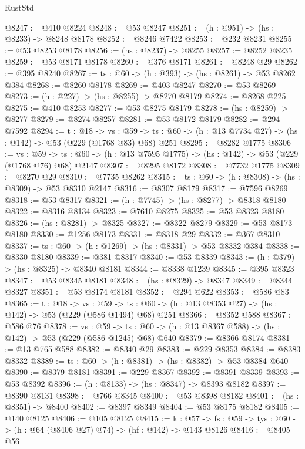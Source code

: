 \begin{lexlean}{RustStd}
\begin{coremodule}
@8247 := @410 @8224
@8248 := @53 @8247
@8251 := (h : @951) -> (hs : @8233) -> @8248 @8178
@8252 := @8246 @7422
@8253 := @232 @8231
@8255 := @53 @8253 @8178
@8256 := (hs : @8237) -> @8255
@8257 := @8252 @8235
@8259 := @53 @8171 @8178
@8260 := @376 @8171
@8261 := @8248 @29
@8262 := @395 @8240
@8267 := {ts : @60} -> (h : @393) -> (hs : @8261) -> @53 @8262 @384
@8268 := @8260 @8178
@8269 := @403 @8247
@8270 := @53 @8269
@8273 := (h : @227) -> (hs : @8255) -> @8270 @8179
@8274 := @8268 @225
@8275 := @410 @8253
@8277 := @53 @8275 @8179
@8278 := (hs : @8259) -> @8277
@8279 := @8274 @8257
@8281 := @53 @8172 @8179
@8282 := @294 @7592
@8294 := {t : @18} ->
  {vs : @59} -> {ts : @60} -> (h : @13 @7734 @27) -> (hs : @142) -> @53 (@229 (@1768 @83) @68) @251
@8295 := @8282 @1775
@8306 := {vs : @59} ->
  {ts : @60} -> (h : @13 @7595 @1775) -> (hs : @142) -> @53 (@229 (@1768 @76) @68) @2147
@8307 := @8295 @8172
@8308 := @7732 @1775
@8309 := @8270 @29
@8310 := @7735 @8262
@8315 := {ts : @60} -> (h : @8308) -> (hs : @8309) -> @53 @8310 @2147
@8316 := @8307 @8179
@8317 := @7596 @8269
@8318 := @53 @8317
@8321 := (h : @7745) -> (hs : @8277) -> @8318 @8180
@8322 := @8316 @8134
@8323 := @7610 @8275
@8325 := @53 @8323 @8180
@8326 := (hs : @8281) -> @8325
@8327 := @8322 @8279
@8329 := @53 @8173 @8180
@8330 := @1256 @8173
@8331 := @8318 @29
@8332 := @367 @8310
@8337 := {ts : @60} -> (h : @1269) -> (hs : @8331) -> @53 @8332 @384
@8338 := @8330 @8180
@8339 := @381 @8317
@8340 := @53 @8339
@8343 := (h : @379) -> (hs : @8325) -> @8340 @8181
@8344 := @8338 @1239
@8345 := @395 @8323
@8347 := @53 @8345 @8181
@8348 := (hs : @8329) -> @8347
@8349 := @8344 @8327
@8351 := @53 @8174 @8181
@8352 := @294 @622
@8353 := @586 @83
@8365 := {t : @18} ->
  {vs : @59} -> {ts : @60} -> (h : @13 @8353 @27) -> (hs : @142) -> @53 (@229 (@586 @1494) @68) @251
@8366 := @8352 @588
@8367 := @586 @76
@8378 := {vs : @59} ->
  {ts : @60} -> (h : @13 @8367 @588) -> (hs : @142) -> @53 (@229 (@586 @1245) @68) @640
@8379 := @8366 @8174
@8381 := @13 @765 @588
@8382 := @8340 @29
@8383 := @229 @8353
@8384 := @8383 @8332
@8389 := {ts : @60} -> (h : @8381) -> (hs : @8382) -> @53 @8384 @640
@8390 := @8379 @8181
@8391 := @229 @8367
@8392 := @8391 @8339
@8393 := @53 @8392
@8396 := (h : @8133) -> (hs : @8347) -> @8393 @8182
@8397 := @8390 @8131
@8398 := @766 @8345
@8400 := @53 @8398 @8182
@8401 := (hs : @8351) -> @8400
@8402 := @8397 @8349
@8404 := @53 @8175 @8182
@8405 := @140 @8125
@8406 := @105 @8125
@8415 := {k : @57} ->
  {fs : @59} -> {tys : @60} -> (h : @64 (@8406 @27) @74) -> (hf : @142) -> @143 @8126
@8416 := @8405 @56

\end{coremodule}
\end{lexlean}
